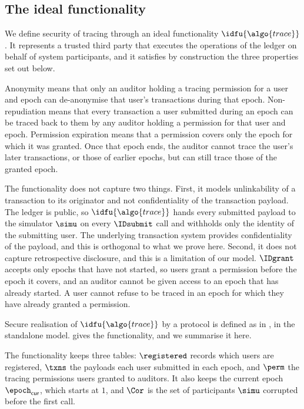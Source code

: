 \subsection{The ideal functionality}

We define security of tracing through an ideal functionality
$\idfu{\algo{trace}}$. It represents a trusted third party that executes the
operations of the ledger on behalf of system participants, and it satisfies by
construction the three properties set out below.

Anonymity means
that only an auditor holding a tracing permission for a user and epoch can
de-anonymise that user's transactions during that epoch. Non-repudiation means
that every transaction a user submitted during an epoch can be traced back to
them by any auditor holding a permission for that user and epoch. Permission
expiration means that a permission covers only the epoch for which it was
granted. Once that epoch ends, the auditor cannot trace the user's later
transactions, or those of earlier epochs, but can still trace those of the
granted epoch.

The functionality does not capture two things. First, it models unlinkability
of a transaction to its originator and not confidentiality of the transaction
payload. The ledger is public, so $\idfu{\algo{trace}}$ hands every submitted
payload to the simulator $\simu$ on every $\IDsubmit$ call and withholds only
the identity of the submitting user.
The underlying transaction system provides confidentiality of the payload, and
this is orthogonal to what we prove here. Second, it does not capture
retrospective disclosure, and this is a limitation of our model. $\IDgrant$
accepts only epochs that have not started, so users grant a permission before
the epoch it covers, and an auditor cannot be given access to an epoch that has
already started. A user cannot refuse to
be traced in an epoch for which they have already granted a
permission.

Secure realisation of $\idfu{\algo{trace}}$ by a protocol is defined as in
, in the standalone model.  gives the functionality, and we
summarise it here.

The functionality keeps three tables: $\registered$ records which users are
registered, $\txns$ the payloads each user submitted in each epoch, and $\perm$
the tracing permissions users granted to auditors. It also keeps the current
epoch $\epoch_{\mathsf{cur}}$, which starts at $1$, and $\Cor$ is the set of
participants $\simu$ corrupted before the first call.


